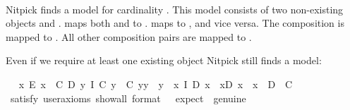 \begin{isabellebody}
\isadelimproof
\ %
\endisadelimproof
%
\isatagproof
{}\isamarkupfalse%
\ \ %
%
\endisatagproof
{\isafoldproof}%
%
\isadelimproof
%
\endisadelimproof
%
\begin{isamarkuptext}%
Nitpick finds a model for cardinality . This model consists of two non-existing
   objects  and .  maps both  and  to
   .  maps  to , and vice versa. The composition 
   is mapped to . All other composition pairs are mapped to .%
\end{isamarkuptext}\isamarkuptrue%
%
\begin{isamarkuptext}%
Even if we require at least one existing object Nitpick still finds a model:%
\end{isamarkuptext}\isamarkuptrue%
\ \isamarkupfalse%
\ {\isachardoublequoteopen}{\isacharparenleft}{\isasymexists}x{\isachardot}\ E\ x{\isacharparenright}\ \isactrlbold {\isasymand}\ {\isacharparenleft}{\isasymexists}C\ D{\isachardot}\ {\isacharparenleft}\isactrlbold {\isasymforall}y{\isachardot}\ I\ {\isacharparenleft}C\ y{\isacharparenright}\ \isactrlbold {\isasymand}\ {\isacharparenleft}C\ y{\isacharparenright}{\isasymcdot}y\ {\isasymcong}\ y{\isacharparenright}\ \isactrlbold {\isasymand}\ {\isacharparenleft}\isactrlbold {\isasymforall}x{\isachardot}\ I\ {\isacharparenleft}D\ x{\isacharparenright}\ \isactrlbold {\isasymand}\ x{\isasymcdot}{\isacharparenleft}D\ x{\isacharparenright}\ {\isasymcong}\ x{\isacharparenright}\ \isactrlbold {\isasymand}\ \isactrlbold {\isasymnot}{\isacharparenleft}D\ \isactrlbold {\isacharequal}\ C{\isacharparenright}{\isacharparenright}{\isachardoublequoteclose}\isanewline
\ \ \ \isamarkupfalse%
\ {\isacharbrackleft}satisfy{\isacharcomma}\ user{\isacharunderscore}axioms{\isacharcomma}\ show{\isacharunderscore}all{\isacharcomma}\ format\ {\isacharequal}\ {}{\isacharcomma}\ expect\ {\isacharequal}\ genuine{\isacharbrackright}%
\isadelimproof
\ %
\endisadelimproof
%
\isatagproof
{}\isamarkupfalse%
\ \ %
%
\endisatagproof
{\isafoldproof}%
%
\isadelimproof
%
\endisadelimproof

\end{isabellebody}
